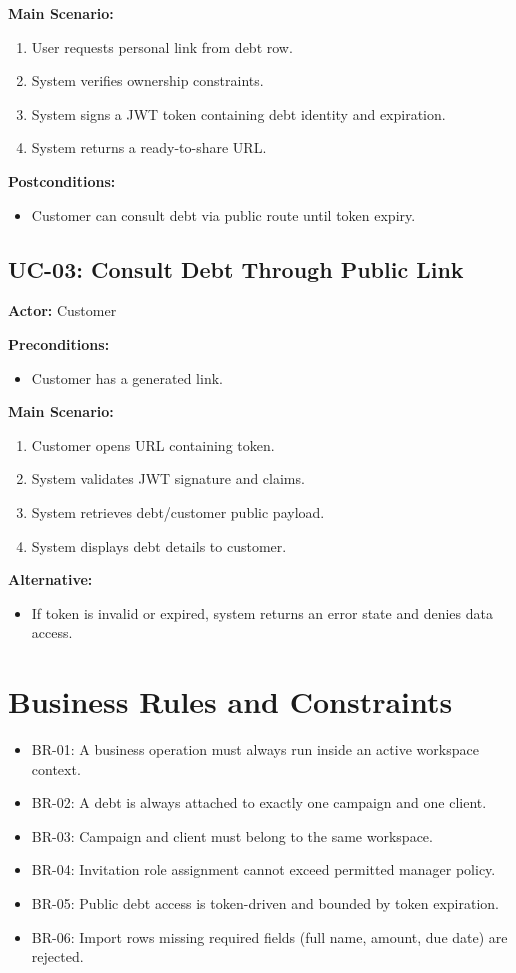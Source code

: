\textbf{Main Scenario:}
\begin{enumerate}
  \item User requests personal link from debt row.
  \item System verifies ownership constraints.
  \item System signs a JWT token containing debt identity and expiration.
  \item System returns a ready-to-share URL.
\end{enumerate}

\textbf{Postconditions:}
\begin{itemize}
  \item Customer can consult debt via public route until token expiry.
\end{itemize}

\subsection{UC-03: Consult Debt Through Public Link}
\textbf{Actor:} Customer

\textbf{Preconditions:}
\begin{itemize}
  \item Customer has a generated link.
\end{itemize}

\textbf{Main Scenario:}
\begin{enumerate}
  \item Customer opens URL containing token.
  \item System validates JWT signature and claims.
  \item System retrieves debt/customer public payload.
  \item System displays debt details to customer.
\end{enumerate}

\textbf{Alternative:}
\begin{itemize}
  \item If token is invalid or expired, system returns an error state and denies data access.
\end{itemize}

\section{Business Rules and Constraints}
\begin{itemize}
  \item BR-01: A business operation must always run inside an active workspace context.
  \item BR-02: A debt is always attached to exactly one campaign and one client.
  \item BR-03: Campaign and client must belong to the same workspace.
  \item BR-04: Invitation role assignment cannot exceed permitted manager policy.
  \item BR-05: Public debt access is token-driven and bounded by token expiration.
  \item BR-06: Import rows missing required fields (full name, amount, due date) are rejected.
\end{itemize}

